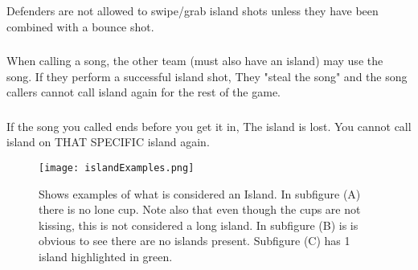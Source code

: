 		\subsubsection{}\label{sssec:IslandShots,swiping}
			Defenders are not allowed to swipe/grab island shots unless they have been combined with a bounce shot.
		\subsubsection{}\label{sssec:IslandShots,stelaing}
			When calling a  song, the other team (must also have an island) may use the song.
            If they perform a successful island shot, They "steal the song" and the song callers cannot call island again for the rest of the game.
		\subsubsection{}\label{sssec:IslandShots,endsong}
			If the song you called ends before you get it in, The island is lost.
            You cannot call island on THAT SPECIFIC island again.
			
    \begin{figure}[h]
        \centering
        \texttt{[image: islandExamples.png]}
        \caption{Shows examples of what is considered an Island. In subfigure (A) there is no lone cup. Note also that even though the cups are not kissing, this is not considered a long island. In subfigure (B) is is obvious to see there are no islands present. Subfigure (C) has 1 island highlighted in green.}
        \label{fig:islandExamples}
    \end{figure}

